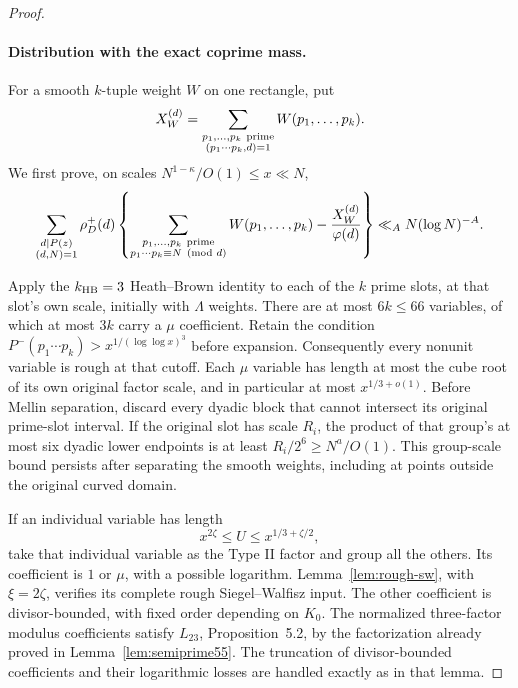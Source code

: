 \begin{proof}
\paragraph{Distribution with the exact coprime mass.}
For a smooth $k$-tuple weight $W$ on one rectangle, put
\[
 X_W^{(d)}
   =\sum_{\substack{p_1,\ldots,p_k\ {\rm prime}\\
                    (p_1\cdots p_k,d)=1}}
                         W(p_1,\ldots,p_k).
\]
We first prove, on scales $N^{1-\kappa}/O(1)\le x\ll N$,
\begin{equation}\label{eq:primeproduct-coprime-error}
 \sum_{\substack{d\mid P(z)\\(d,N)=1}}\rho_D^+(d)
 \left\{
  \sum_{\substack{p_1,\ldots,p_k\ {\rm prime}\\
            p_1\cdots p_k\equiv N\pmod d}}W(p_1,\ldots,p_k)
       -\frac{X_W^{(d)}}{\varphi(d)}
 \right\}
 \ll_A N(\log N)^{-A}.
\end{equation}

Apply the $k_{\rm HB}=3$ Heath--Brown identity to each of the
$k$ prime slots, at that slot's own scale, initially with
$\Lambda$ weights. There are at most $6k\le66$ variables,
of which at most $3k$ carry a $\mu$ coefficient.
Retain the condition
$P^-(p_1\cdots p_k)>x^{1/(\log\log x)^3}$ before expansion.
Consequently every nonunit variable is rough at that cutoff.
Each $\mu$ variable has length at most the cube root of
its own original factor scale, and in particular at most
$x^{1/3+o(1)}$.
Before Mellin separation, discard every dyadic block that cannot
intersect its original prime-slot interval. If the original slot has
scale $R_i$, the product of that group's at most six dyadic lower
endpoints is at least $R_i/2^6\ge N^a/O(1)$. This group-scale bound
persists after separating the smooth weights, including at points
outside the original curved domain.

If an individual variable has length
\[
 x^{2\zeta}\le U\le x^{1/3+\zeta/2},
\]
take that individual variable as the Type II factor and group
all the others. Its coefficient is $1$ or $\mu$, with a possible
logarithm. Lemma~\ref{lem:rough-sw}, with $\xi=2\zeta$,
verifies its complete rough Siegel--Walfisz input.
The other coefficient is divisor-bounded, with fixed order
depending on $K_0$. The normalized three-factor modulus
coefficients satisfy $L_{23}$, Proposition~5.2, by the
factorization already proved in Lemma~\ref{lem:semiprime55}.
The truncation of divisor-bounded coefficients and their
logarithmic losses are handled exactly as in that lemma.


\end{proof}

